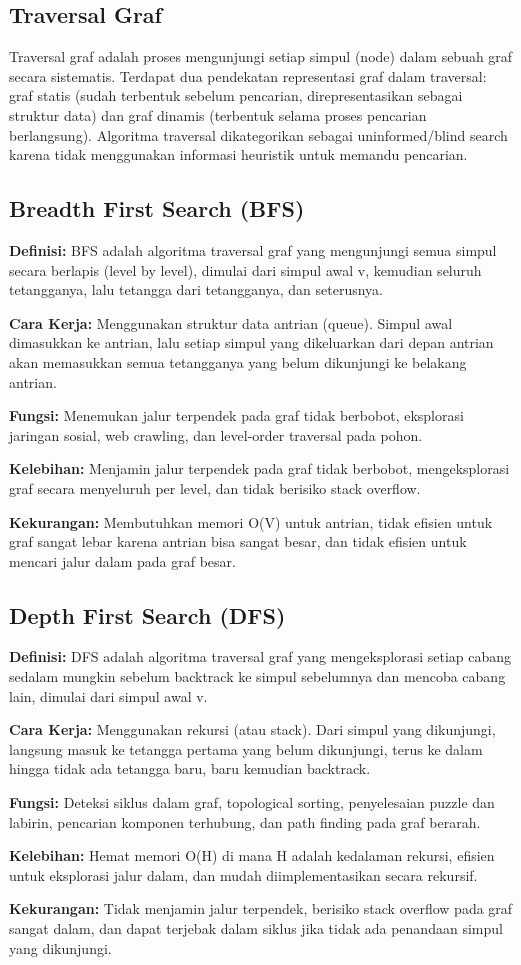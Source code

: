 \subsection{Traversal Graf}
Traversal graf adalah proses mengunjungi setiap simpul (node) dalam sebuah graf secara sistematis. Terdapat dua pendekatan representasi graf dalam traversal: graf statis (sudah terbentuk sebelum pencarian, direpresentasikan sebagai struktur data) dan graf dinamis (terbentuk selama proses pencarian berlangsung). Algoritma traversal dikategorikan sebagai uninformed/blind search karena tidak menggunakan informasi heuristik untuk memandu pencarian.

\subsection{Breadth First Search (BFS)}
\textbf{Definisi:} BFS adalah algoritma traversal graf yang mengunjungi semua simpul secara berlapis (level by level), dimulai dari simpul awal v, kemudian seluruh tetangganya, lalu tetangga dari tetangganya, dan seterusnya.

\textbf{Cara Kerja:} Menggunakan struktur data antrian (queue). Simpul awal dimasukkan ke antrian, lalu setiap simpul yang dikeluarkan dari depan antrian akan memasukkan semua tetangganya yang belum dikunjungi ke belakang antrian.

\textbf{Fungsi:} Menemukan jalur terpendek pada graf tidak berbobot, eksplorasi jaringan sosial, web crawling, dan level-order traversal pada pohon.

\textbf{Kelebihan:} Menjamin jalur terpendek pada graf tidak berbobot, mengeksplorasi graf secara menyeluruh per level, dan tidak berisiko stack overflow.

\textbf{Kekurangan:} Membutuhkan memori O(V) untuk antrian, tidak efisien untuk graf sangat lebar karena antrian bisa sangat besar, dan tidak efisien untuk mencari jalur dalam pada graf besar.

\subsection{Depth First Search (DFS)}
\textbf{Definisi:} DFS adalah algoritma traversal graf yang mengeksplorasi setiap cabang sedalam mungkin sebelum backtrack ke simpul sebelumnya dan mencoba cabang lain, dimulai dari simpul awal v.

\textbf{Cara Kerja:} Menggunakan rekursi (atau stack). Dari simpul yang dikunjungi, langsung masuk ke tetangga pertama yang belum dikunjungi, terus ke dalam hingga tidak ada tetangga baru, baru kemudian backtrack.

\textbf{Fungsi:} Deteksi siklus dalam graf, topological sorting, penyelesaian puzzle dan labirin, pencarian komponen terhubung, dan path finding pada graf berarah.

\textbf{Kelebihan:} Hemat memori O(H) di mana H adalah kedalaman rekursi, efisien untuk eksplorasi jalur dalam, dan mudah diimplementasikan secara rekursif.

\textbf{Kekurangan:} Tidak menjamin jalur terpendek, berisiko stack overflow pada graf sangat dalam, dan dapat terjebak dalam siklus jika tidak ada penandaan simpul yang dikunjungi.